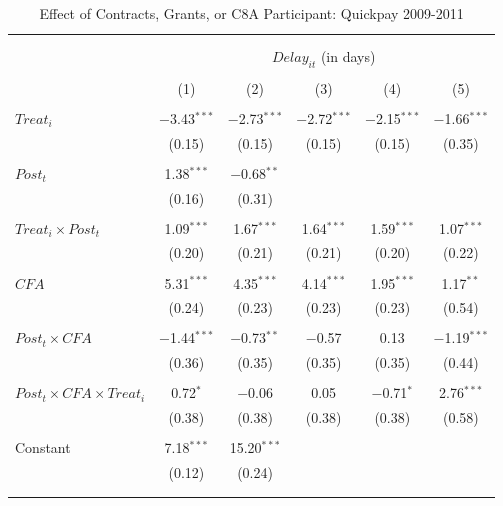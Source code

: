 \documentclass[
]{article}
\begin{document}
\begin{table}[H] \centering 
  \caption{Effect of Contracts, Grants, or C8A Participant: Quickpay 2009-2011} 
  \label{} 
\small 
\begin{tabular}{@{\extracolsep{-2pt}}lccccc} 
\\[-1.8ex]\hline 
\hline \\[-1.8ex] 
\\[-1.8ex] & \multicolumn{5}{c}{$Delay_{it}$ (in days)} \\ 
\\[-1.8ex] & (1) & (2) & (3) & (4) & (5)\\ 
\hline \\[-1.8ex] 
 $Treat_i$ & $-$3.43$^{***}$ & $-$2.73$^{***}$ & $-$2.72$^{***}$ & $-$2.15$^{***}$ & $-$1.66$^{***}$ \\ 
  & (0.15) & (0.15) & (0.15) & (0.15) & (0.35) \\ 
  & & & & & \\ 
 $Post_t$ & 1.38$^{***}$ & $-$0.68$^{**}$ &  &  &  \\ 
  & (0.16) & (0.31) &  &  &  \\ 
  & & & & & \\ 
 $Treat_i \times Post_t$ & 1.09$^{***}$ & 1.67$^{***}$ & 1.64$^{***}$ & 1.59$^{***}$ & 1.07$^{***}$ \\ 
  & (0.20) & (0.21) & (0.21) & (0.20) & (0.22) \\ 
  & & & & & \\ 
 $CFA$ & 5.31$^{***}$ & 4.35$^{***}$ & 4.14$^{***}$ & 1.95$^{***}$ & 1.17$^{**}$ \\ 
  & (0.24) & (0.23) & (0.23) & (0.23) & (0.54) \\ 
  & & & & & \\ 
 $Post_t \times CFA$ & $-$1.44$^{***}$ & $-$0.73$^{**}$ & $-$0.57 & 0.13 & $-$1.19$^{***}$ \\ 
  & (0.36) & (0.35) & (0.35) & (0.35) & (0.44) \\ 
  & & & & & \\ 
 $Post_t \times CFA \times Treat_i$ & 0.72$^{*}$ & $-$0.06 & 0.05 & $-$0.71$^{*}$ & 2.76$^{***}$ \\ 
  & (0.38) & (0.38) & (0.38) & (0.38) & (0.58) \\ 
  & & & & & \\ 
 Constant & 7.18$^{***}$ & 15.20$^{***}$ &  &  &  \\ 
  & (0.12) & (0.24) &  &  &  \\ 
  & & & & & \\ 
\hline \\[-1.8ex] 

\end{tabular}
\end{table}
\end{document}
